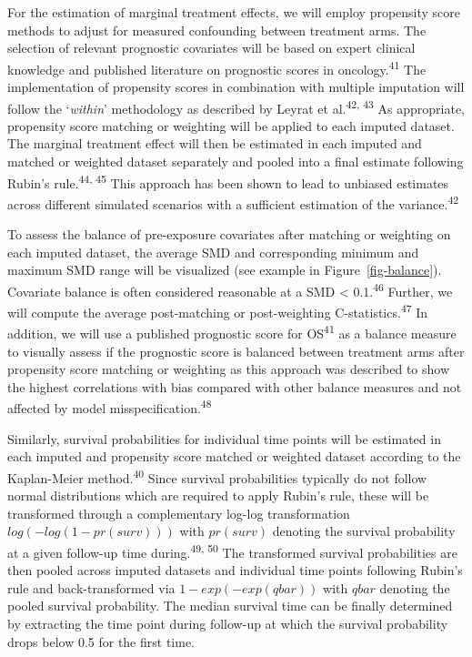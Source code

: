 \documentclass[
  letterpaper,
  DIV=11,
  numbers=noendperiod]{scrartcl}
\begin{document}
For the estimation of marginal treatment effects, we will employ
propensity score methods to adjust for measured confounding between
treatment arms. The selection of relevant prognostic covariates will be
based on expert clinical knowledge and published literature on
prognostic scores in oncology.\textsuperscript{41} The implementation of
propensity scores in combination with multiple imputation will follow
the `\emph{within}' methodology as described by Leyrat et
al.\textsuperscript{42, 43} As appropriate, propensity score matching or
weighting will be applied to each imputed dataset. The marginal
treatment effect will then be estimated in each imputed and matched or
weighted dataset separately and pooled into a final estimate following
Rubin's rule.\textsuperscript{44, 45} This approach has been shown to
lead to unbiased estimates across different simulated scenarios with a
sufficient estimation of the variance.\textsuperscript{42}

To assess the balance of pre-exposure covariates after matching or
weighting on each imputed dataset, the average SMD and corresponding
minimum and maximum SMD range will be visualized (see example in
Figure~\ref{fig-balance}). Covariate balance is often considered
reasonable at a SMD \textless{} 0.1.\textsuperscript{46} Further, we
will compute the average post-matching or post-weighting
C-statistics.\textsuperscript{47} In addition, we will use a published
prognostic score for OS\textsuperscript{41} as a balance measure to
visually assess if the prognostic score is balanced between treatment
arms after propensity score matching or weighting as this approach was
described to show the highest correlations with bias compared with other
balance measures and not affected by model
misspecification.\textsuperscript{48}

Similarly, survival probabilities for individual time points will be
estimated in each imputed and propensity score matched or weighted
dataset according to the Kaplan-Meier method.\textsuperscript{40} Since
survival probabilities typically do not follow normal distributions
which are required to apply Rubin's rule, these will be transformed
through a complementary log-log transformation \(log(-log(1-pr(surv)))\)
with \(pr(surv)\) denoting the survival probability at a given follow-up
time during.\textsuperscript{49, 50} The transformed survival
probabilities are then pooled across imputed datasets and individual
time points following Rubin's rule and back-transformed via
\(1-exp(-exp(qbar))\) with \(qbar\) denoting the pooled survival
probability. The median survival time can be finally determined by
extracting the time point during follow-up at which the survival
probability drops below 0.5 for the first time.
\end{document}
